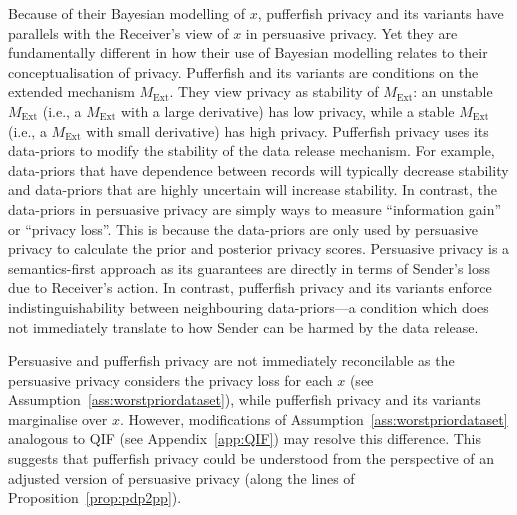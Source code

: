 \documentclass{article}
\theoremstyle{plain}
\theoremstyle{plain}
\theoremstyle{definition}
\theoremstyle{remark}
\theoremstyle{plain}
\newcommand{\Mext}{M_{\mathrm{Ext}}}
\begin{document}
Because of their Bayesian modelling of $x$, pufferfish privacy and its variants have parallels with the Receiver's view of $x$ in persuasive privacy. Yet they are fundamentally different in how their use of Bayesian modelling relates to their conceptualisation of privacy. Pufferfish and its variants are conditions on the extended mechanism $\Mext$. They view privacy as stability of $\Mext$: an unstable $\Mext$ (i.e., a $\Mext$ with a large derivative) has low privacy, while a stable $\Mext$ (i.e., a $\Mext$ with small derivative) has high privacy. Pufferfish privacy uses its data-priors to modify the stability of the data release mechanism. For example, data-priors that have dependence between records will typically decrease stability and data-priors that are highly uncertain will increase stability. In contrast, the data-priors in persuasive privacy are simply ways to measure ``information gain'' or ``privacy loss''. This is because the data-priors are only used by persuasive privacy to calculate the prior and posterior privacy scores. Persuasive privacy is a semantics-first approach as its guarantees are directly in terms of Sender's loss due to Receiver's action. In contrast, pufferfish privacy and its variants enforce indistinguishability between neighbouring data-priors---a condition which does not immediately translate to how Sender can be harmed by the data release.

Persuasive and pufferfish privacy are not immediately reconcilable as the persuasive privacy considers the privacy loss for each $x$ (see Assumption~\ref{ass:worstpriordataset}), while pufferfish privacy and its variants marginalise over $x$.
However, modifications of Assumption~\ref{ass:worstpriordataset} analogous to QIF (see Appendix~\ref{app:QIF})
may resolve this difference. This suggests that pufferfish privacy could be understood from the perspective of an adjusted version of persuasive privacy (along the lines of Proposition~\ref{prop:pdp2pp}).
\end{document}

